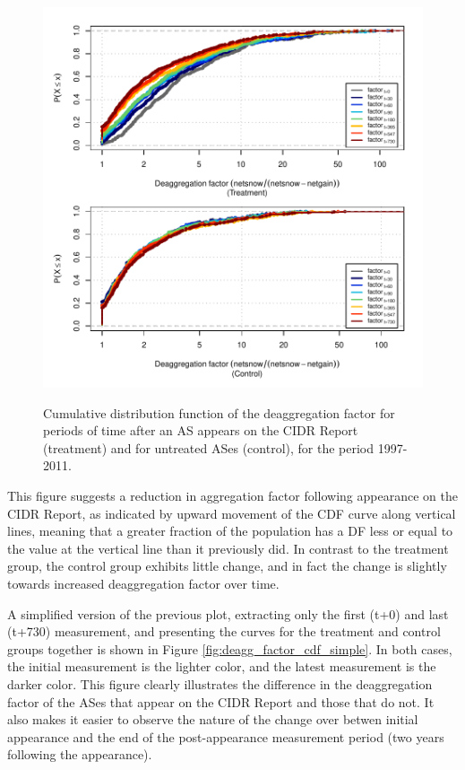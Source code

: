 \begin{figure}[h!]
\begin{centering}
\begin{singlespace}
    \includegraphics[width=6in]
        {figures/behavior-deagg_factor-1997_2011-corr.pdf}
    \vspace{-2em}\\
    \caption{Cumulative distribution function of the deaggregation factor for
    periods of time after an AS appears on the CIDR Report (treatment) and for
    untreated ASes (control), for the period 1997-2011.}
    \label{fig:deagg_factor_cdf}
\end{singlespace}
\end{centering}
\end{figure}

This figure suggests a reduction in aggregation factor following appearance on
the CIDR Report, as indicated by upward movement of the CDF curve along
vertical lines, meaning that a greater fraction of the population has a DF less
or equal to the value at the vertical line than it previously did. In contrast
to the treatment group, the control group exhibits little change, and in fact
the change is slightly towards increased deaggregation factor over time.

A simplified version of the previous plot, extracting only the first (t+0) and
last (t+730) measurement, and presenting the curves for the treatment and
control groups together is shown in Figure \ref{fig:deagg_factor_cdf_simple}. In
both cases, the initial measurement is the lighter color, and the latest
measurement is the darker color. This figure clearly illustrates the difference
in the deaggregation factor of the ASes that appear on the CIDR Report and
those that do not. It also makes it easier to observe the nature of the change
over betwen initial appearance and the end of the post-appearance measurement
period (two years following the appearance).

